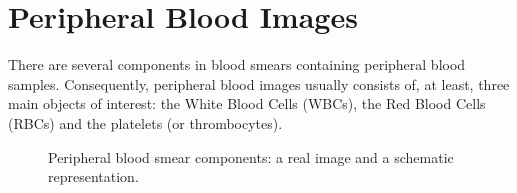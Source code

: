 \documentclass[final,a4paper,12pt,english]{UnicaPhdThesis3}
\begin{document}
	\section{Peripheral Blood Images}
	There are several components in blood smears containing peripheral blood samples. Consequently, peripheral blood images usually consists of, at least, three main objects of interest: the White Blood Cells (\acs{WBC}s), the Red Blood Cells (\acs{RBC}s) and the platelets (or thrombocytes). 
	
	\begin{figure}[!htbp]
		\centering
		\caption{\label{fig:leukocytes} Peripheral blood smear components: a real image and a schematic representation.}
	\end{figure}
	
\end{document}
